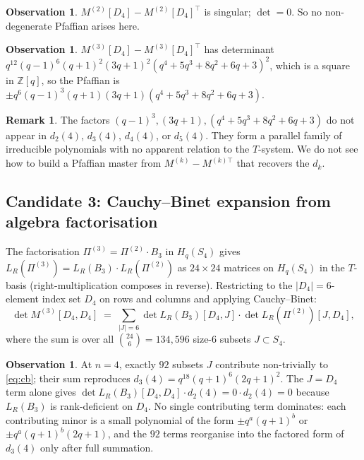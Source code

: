 \documentclass[11pt]{article}
\theoremstyle{definition}
\newtheorem{remark}[theorem]{Remark}
\newtheorem{observation}[theorem]{Observation}
\begin{document}
\begin{observation}
$M^{(2)}[D_4] - M^{(2)}[D_4]^\top$ is singular; $\det = 0$. So no non-degenerate
Pfaffian arises here.
\end{observation}

\begin{observation}
$M^{(3)}[D_4] - M^{(3)}[D_4]^\top$ has determinant
$q^{12}(q-1)^6(q+1)^2(3q+1)^2(q^4 + 5q^3 + 8q^2 + 6q + 3)^2$, which is a
square in $\mathbb{Z}[q]$, so the Pfaffian is
$\pm q^6(q-1)^3(q+1)(3q+1)(q^4+5q^3+8q^2+6q+3)$.
\end{observation}

\begin{remark}
The factors $(q-1)^3, (3q+1), (q^4+5q^3+8q^2+6q+3)$ do not appear in $d_2(4)$,
$d_3(4)$, $d_4(4)$, or $d_5(4)$. They form a parallel family of irreducible
polynomials with no apparent relation to the $T$-system. We do not see how to
build a Pfaffian master from $M^{(k)} - M^{(k)\top}$ that recovers the $d_k$.
\end{remark}

\subsection{Candidate 3: Cauchy--Binet expansion from algebra factorisation}

The factorisation $\Pi^{(3)} = \Pi^{(2)} \cdot B_3$ in $H_q(S_4)$ gives
$L_R(\Pi^{(3)}) = L_R(B_3) \cdot L_R(\Pi^{(2)})$ as $24 \times 24$ matrices on
$H_q(S_4)$ in the $T$-basis (right-multiplication composes in reverse). Restricting
to the $|D_4| = 6$-element index set $D_4$ on rows and columns and applying
Cauchy--Binet:
\begin{equation}\label{eq:cb}
\det M^{(3)}[D_4,D_4]
\;=\; \sum_{|J| = 6} \det L_R(B_3)[D_4, J] \cdot \det L_R(\Pi^{(2)})[J, D_4],
\end{equation}
where the sum is over all $\binom{24}{6} = 134{,}596$ size-$6$ subsets $J \subset
S_4$.

\begin{observation}
At $n=4$, exactly $92$ subsets $J$ contribute non-trivially to
\eqref{eq:cb}; their sum reproduces $d_3(4) = q^{18}(q+1)^6(2q+1)^2$. The
$J = D_4$ term alone gives $\det L_R(B_3)[D_4,D_4] \cdot d_2(4) = 0 \cdot d_2(4) = 0$
because $L_R(B_3)$ is rank-deficient on $D_4$. No single contributing term
dominates: each contributing minor is a small polynomial of the form
$\pm q^a (q+1)^b$ or $\pm q^a (q+1)^b (2q+1)$, and the $92$ terms reorganise
into the factored form of $d_3(4)$ only after full summation.
\end{observation}
\end{document}
